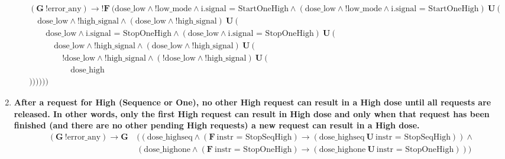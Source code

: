 \documentclass[a4paper,10pt]{article}
\newcommand{\LTLG}{\mathbf{G~}}
\newcommand{\LTLF}{\mathbf{F~}}
\newcommand{\LTLU}{\mathbf{~U~}}
\newcommand{\imply}{\rightarrow}
\newcommand{\doselow}{\textrm{dose\_low}}
\newcommand{\dosehigh}{\textrm{dose\_high}}
\newcommand{\dosehighseq}{\textrm{dose\_highseq}}
\newcommand{\dosehighone}{\textrm{dose\_highone}}
\newcommand{\highsignal}{\textrm{high\_signal}}
\newcommand{\errorany}{\textrm{error\_any}}
\newcommand{\lowmode}{\textrm{low\_mode}}
\begin{document}
\begin{enumerate}
\begin{align*}
				&(\LTLG !\errorany) \imply !\LTLF (\doselow \land !\lowmode \land \textrm{i.signal = StartOneHigh} \land (\doselow \land !\lowmode \land \textrm{i.signal = StartOneHigh}) \LTLU ( \\
				&	\hspace{1em}\doselow \land !\highsignal \land (\doselow \land !\highsignal) \LTLU ( \\
				&		\hspace{2em}\doselow \land \textrm{i.signal = StopOneHigh} \land (\doselow \land \textrm{i.signal = StopOneHigh}) \LTLU ( \\
				&			\hspace{3em}\doselow \land !\highsignal \land (\doselow \land !\highsignal) \LTLU ( \\
				&				\hspace{4em}!\doselow \land !\highsignal \land (!\doselow \land !\highsignal) \LTLU ( \\
				&					\hspace{5em}\dosehigh \\
				&))))))
			\end{align*}

		\item \textbf{After a request for High (Sequence or One), no other High request can result in a High dose until all requests are released. In other words, only the first High request can result in High dose and only when that request has been finished (and there are no other pending High requests) a new request can result in a High dose.}
			\begin{align*}
				(\LTLG !\errorany) \imply \LTLG &((\dosehighseq \land (\LTLF \textrm{instr = StopSeqHigh}) \imply (\dosehighseq \LTLU \textrm{instr = StopSeqHigh})) \land \\
					&(\dosehighone \land (\LTLF \textrm{instr = StopOneHigh}) \imply (\dosehighone \LTLU \textrm{instr = StopOneHigh})))
			\end{align*}


\end{enumerate}
\end{document}
